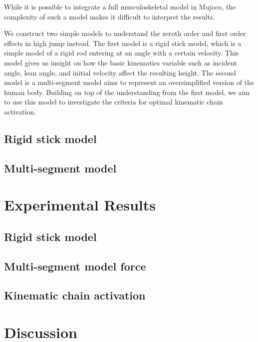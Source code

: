 \documentclass[twocolumn]{aastex631}
\begin{document}
While it is possible to integrate a full musculoskeletal model in Mujoco, the complexity of such a model makes it difficult to interpret the results.

We construct two simple models to understand the zeroth order and first order effects in high jump instead. The first model is a rigid stick model, which is a simple model of a rigid rod entering at an angle with a certain velocity. This model gives us insight on how the basic kinematics variable such as incident angle, lean angle, and initial velocity affect the resulting height. The second model is a multi-segment model aims to represent an oversimplified version of the human body. Building on top of the understanding from the first model, we aim to use this model to investigate the criteria for optimal kinematic chain activation.

\subsection{Rigid stick model}


\subsection{Multi-segment model}


\section{Experimental Results}
\label{sec:results}

\subsection{Rigid stick model}

\subsection{Multi-segment model force}

\subsection{Kinematic chain activation}

\section{Discussion}
\label{sec:discussion}





\end{document}
